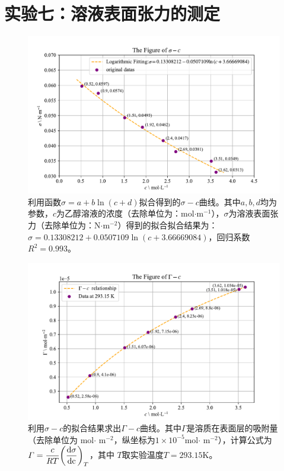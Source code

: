 \documentclass[UTF8,AutoFakeBold,a4paper]{article}
\begin{document}
\section{实验七：溶液表面张力的测定}
\begin{figure}[h]
	\centering
	\includegraphics[scale=0.8]{Figure1}
	\caption{利用函数$\sigma = a + b \ln{(c + d)}$拟合得到的$\sigma - c$曲线。其中$a,b,d$均为参数，$c$为乙醇溶液的浓度（去除单位为：mol$\cdot$m$^{-1}$），$\sigma$为溶液表面张力（去除单位为：N$\cdot$m$^{-2}$）得到的拟合拟合结果为：\textcolor[rgb]{0.54,0.13,0.33}{$ \sigma= 0.13308212+0.0507109\ln{(c + 3.66669084)}$}，回归系数$R^{2} = 0.993$。}
	\label{fi2}
\end{figure}
\newpage
\begin{figure}[h]
	\centering
	\includegraphics[scale=0.8]{Figure2}
	\caption{利用$\sigma - c$的拟合结果求出$\varGamma - c$曲线。其中$\varGamma$是溶质在表面层的吸附量（去除单位为 mol$\cdot$ m$^{-2}$，纵坐标为$1\times 10^{-5}$mol$\cdot$ m$^{-2}$），计算公式为\textcolor[rgb]{0.07,0.36,0.57}{$\varGamma = \dfrac{c}{RT}\pqty{\dfrac{\rm{d}\sigma}{\rm{d}c}}_{T}$}，其中 $T$取实验温度$T = 293.15$K。}
	\label{fi3}
\end{figure}
\end{document}
